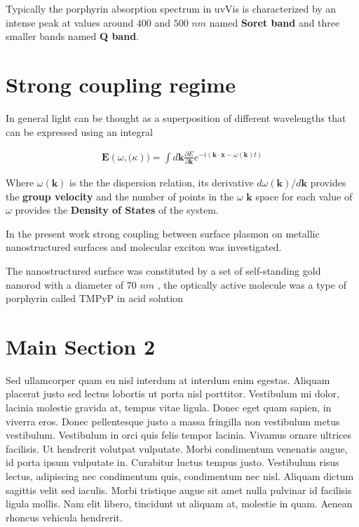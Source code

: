 Typically the porphyrin absorption spectrum in uvVis is characterized by an intense peak at values around $400$ and $500$ $nm$ named {\bf Soret band} and three smaller bands named {\bf Q band}.
\section{Strong coupling regime}


In general light can be thought as a superposition of different wavelengths that can be expressed using an integral

\begin{eqnarray}
	\mathbf{E}(\omega, \mathbf(\kappa) ) = \int d\mathbf{k} \frac{ \partial E }{\partial \mathbf{k} }e^{-i\left( \mathbf{k}\cdot\mathbf{x} - \omega(\mathbf{k})t \right) }
\end{eqnarray}


Where $\omega(\mathbf{k})$ is the the dispersion relation, its derivative $d\omega(\mathbf{k})/d\mathbf{k}$ provides the {\bf group velocity} and the number of points in the $\omega$ $\mathbf{k}$ space for each value of $\omega$ provides the {\bf Density of States} of the system.

In the present work strong coupling between surface plasmon on metallic nanostructured surfaces and molecular exciton was investigated. 

The nanostructured surface was constituted by a set of self-standing gold nanorod with a diameter of $70$ $nm$ , the optically active molecule was a type of porphyrin called TMPyP in acid solution





\section{Main Section 2}

Sed ullamcorper quam eu nisl interdum at interdum enim egestas. Aliquam placerat justo sed lectus lobortis ut porta nisl porttitor. Vestibulum mi dolor, lacinia molestie gravida at, tempus vitae ligula. Donec eget quam sapien, in viverra eros. Donec pellentesque justo a massa fringilla non vestibulum metus vestibulum. Vestibulum in orci quis felis tempor lacinia. Vivamus ornare ultrices facilisis. Ut hendrerit volutpat vulputate. Morbi condimentum venenatis augue, id porta ipsum vulputate in. Curabitur luctus tempus justo. Vestibulum risus lectus, adipiscing nec condimentum quis, condimentum nec nisl. Aliquam dictum sagittis velit sed iaculis. Morbi tristique augue sit amet nulla pulvinar id facilisis ligula mollis. Nam elit libero, tincidunt ut aliquam at, molestie in quam. Aenean rhoncus vehicula hendrerit.